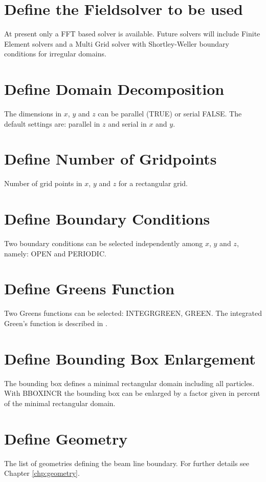 \section{Define the Fieldsolver to be used}
\label{sec:FSFSTYPE}
At present only a FFT based solver is available. Future solvers will include 
Finite Element solvers and a Multi Grid solver with Shortley-Weller boundary conditions for 
irregular domains. 

\section{Define Domain Decomposition}
\label{sec:FSDomDEC}
The dimensions in  $x$, $y$ and $z$ can be parallel (TRUE)  or serial FALSE. The
default settings are: parallel in $z$ and serial in $x$ and $y$. 

\section{Define Number of Gridpoints}
\label{sec:FSMX}
Number of grid points in $x$, $y$ and $z$ for a rectangular grid.

\section{Define Boundary Conditions}
\label{sec:FSBC}
Two boundary conditions can be selected independently among $x$, $y$ and $z$, namely:  OPEN and PERIODIC. 

\section{Define Greens Function}
\label{sec:FSGREEN}
Two Greens functions can be selected: INTEGRGREEN, GREEN. The integrated Green's function is described in \cite{qiang2005}. 

\section{Define Bounding Box Enlargement}
\label{sec:FSBBOX}
The bounding box defines a minimal rectangular domain including all particles. With BBOXINCR 
the bounding box can be enlarged by a factor given in percent of the minimal rectangular domain.

\section{Define Geometry}
\label{sec:GEOMETRY}
The list of geometries defining the beam line boundary. For further details see Chapter \ref{chp:geometry}.

